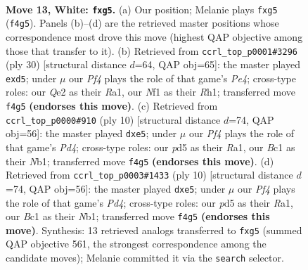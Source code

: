 \documentclass[11pt]{article}
\begin{document}
\clearpage

\begin{figure}[p]\centering
\begin{subfigure}{0.46\textwidth}\centering
\resizebox{\linewidth}{!}{%
\newchessgame
\chessboard[
  setfen={r1b1kb1r/pp1n1p2/1q2p3/3pP1pp/5P2/8/PP2Q1PP/R1BK1NNR w kq - 0 13},
  showmover=false,
  pgfstyle=straightmove, color=movearrow, markmove={f4-g5}
]}
\caption{}
\end{subfigure}\hfill
\begin{subfigure}{0.46\textwidth}\centering
\resizebox{\linewidth}{!}{%
\newchessgame
\chessboard[
  setfen={r1b4r/1pq1bk2/p4npp/3pp3/4P3/2NQ2P1/PPP3NP/R3KB1R w KQ - 0 16},
  showmover=false,
  pgfstyle=straightmove, color=movearrow, markmove={e4-d5}
]}
\caption{}
\end{subfigure}
\\[4pt]
\begin{subfigure}{0.46\textwidth}\centering
\resizebox{\linewidth}{!}{%
\newchessgame
\chessboard[
  setfen={r1b1kbnr/pppq1ppp/2n5/4p3/2BP4/1Q2P3/PP3PPP/RNB1K1NR w KQkq - 3 6},
  showmover=false,
  pgfstyle=straightmove, color=movearrow, markmove={d4-e5}
]}
\caption{}
\end{subfigure}\hfill
\begin{subfigure}{0.46\textwidth}\centering
\resizebox{\linewidth}{!}{%
\newchessgame
\chessboard[
  setfen={r1b1kbnr/pppq1ppp/2n5/4p3/2BP4/1Q2P3/PP3PPP/RNB1K1NR w KQkq - 3 6},
  showmover=false,
  pgfstyle=straightmove, color=movearrow, markmove={d4-e5}
]}
\caption{}
\end{subfigure}
\caption{\textbf{Move 13, White: \texttt{fxg5}.} (a) Our position; Melanie plays \texttt{fxg5} (\texttt{f4g5}). Panels (b)--(d) are the retrieved master positions whose correspondence most drove this move (highest QAP objective among those that transfer to it). (b) Retrieved from \texttt{ccrl\_top\_p0001\#3296} (ply 30) [structural distance $d$=64, QAP obj=65]: the master played \texttt{exd5}; under $\mu$ our \emph{Pf4} plays the role of that game's \emph{Pe4}; cross-type roles: our \emph{Q}e2 as their \emph{R}a1, our \emph{N}f1 as their \emph{R}h1; transferred move \texttt{f4g5} \textbf{(endorses this move)}. (c) Retrieved from \texttt{ccrl\_top\_p0000\#910} (ply 10) [structural distance $d$=74, QAP obj=56]: the master played \texttt{dxe5}; under $\mu$ our \emph{Pf4} plays the role of that game's \emph{Pd4}; cross-type roles: our \emph{p}d5 as their \emph{R}a1, our \emph{B}c1 as their \emph{N}b1; transferred move \texttt{f4g5} \textbf{(endorses this move)}. (d) Retrieved from \texttt{ccrl\_top\_p0003\#1433} (ply 10) [structural distance $d$=74, QAP obj=56]: the master played \texttt{dxe5}; under $\mu$ our \emph{Pf4} plays the role of that game's \emph{Pd4}; cross-type roles: our \emph{p}d5 as their \emph{R}a1, our \emph{B}c1 as their \emph{N}b1; transferred move \texttt{f4g5} \textbf{(endorses this move)}. Synthesis: 13 retrieved analogs transferred to \texttt{fxg5} (summed QAP objective 561, the strongest correspondence among the candidate moves); Melanie committed it via the \texttt{search} selector.}
\label{fig:thought-m24}
\end{figure}
\end{document}
